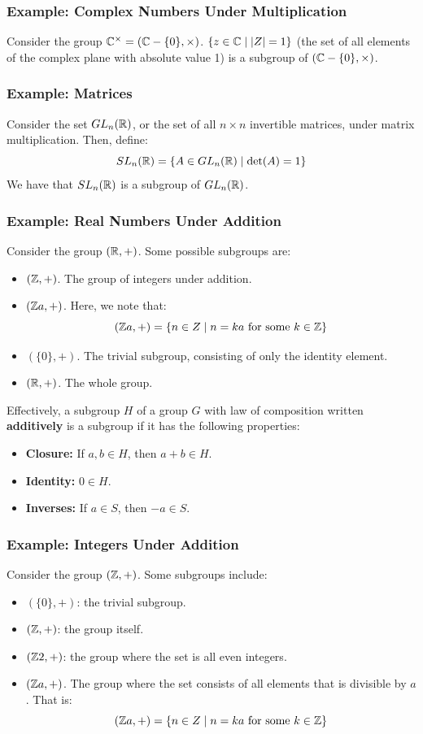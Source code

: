 \documentclass[letterpaper]{article}
\begin{document}
\subsubsection{Example: Complex Numbers Under Multiplication}
Consider the group $\mathbb{C}^{\times} = (\mathbb{C} - \{0\}, \times)$. $\{z \in \mathbb{C} \mid |Z| = 1\}$ (the set of all elements of the complex plane with absolute value 1) is a subgroup of $(\mathbb{C} - \{0\}, \times)$. 

\subsubsection{Example: Matrices}
Consider the set $GL_{n}(\mathbb{R})$, or the set of all $n \times n$ invertible matrices, under matrix multiplication. Then, define: 
\[SL_{n}(\mathbb{R}) = \{A \in GL_{n}(\mathbb{R}) \mid \det(A) = 1\}\]
We have that $SL_{n}(\mathbb{R})$ is a subgroup of $GL_{n}(\mathbb{R})$. 

\subsubsection{Example: Real Numbers Under Addition}
Consider the group $(\mathbb{R}, +)$. Some possible subgroups are: 
\begin{itemize}
    \item $(\mathbb{Z}, +)$. The group of integers under addition. 
    \item $(\mathbb{Z} a, +)$. Here, we note that:
    \[(\mathbb{Z} a, +) = \{n \in Z \mid n = ka \text{ for some } k \in \mathbb{Z}\}\]
    \item $(\{0\}, +)$. The trivial subgroup, consisting of only the identity element.
    \item $(\mathbb{R}, +)$. The whole group. 
\end{itemize}

Effectively, a subgroup $H$ of a group $G$ with law of composition written \textbf{additively} is a subgroup if it has the following properties: 
\begin{itemize}
    \item \textbf{Closure:} If $a, b \in H$, then $a + b \in H$. 
    \item \textbf{Identity:} $0 \in H$. 
    \item \textbf{Inverses:} If $a \in S$, then $-a \in S$. 
\end{itemize}

\subsubsection{Example: Integers Under Addition}
Consider the group $(\mathbb{Z}, +)$. Some subgroups include: 
\begin{itemize}
    \item $(\{0\}, +)$: the trivial subgroup.
    \item $(\mathbb{Z}, +)$: the group itself.
    \item $(\mathbb{Z} 2, +)$: the group where the set is all even integers. 
    \item $(\mathbb{Z} a, +)$. The group where the set consists of all elements that is divisible by $a$. That is: 
    \[(\mathbb{Z} a, +) = \{n \in Z \mid n = ka \text{ for some } k \in \mathbb{Z}\}\] 
\end{itemize}
\end{document}
